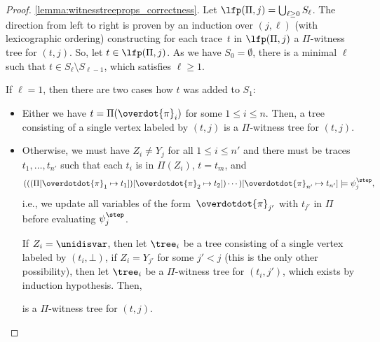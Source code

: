 \begin{proof}
\ref{lemma:witnesstreeprops_correctness}. 
Let $\lfp(\Pi, j) = \bigcup_{\ell \ge 0} S_\ell$. The direction from left to right is proven by an induction over $(j,\ell)$ (with lexicographic ordering) constructing for each trace~$t$ in $\lfp(\Pi,j)$ a $\Pi$-witness tree for $(t,j)$.
So, let $t \in \lfp(\Pi, j)$. As we have $S_0 = \emptyset$, there is a minimal $\ell$ such that $t \in S_\ell \setminus S_{\ell-1}$, which satisfies $\ell \ge 1$.

If $\ell = 1$, then there are two cases how $t$ was added to $S_1$:
\begin{itemize}
    \item Either we have $t = \Pi(\overdot{\pi}_i)$ for some $1 \le i \le n$. Then, a tree consisting of a single vertex labeled by $(t,j)$ is a $\Pi$-witness tree for $(t,j)$.
    \item Otherwise, we must have $Z_i \neq Y_j$ for all $1 \le i \le n'$ and there must be traces~$t_1, \ldots, t_{n'}$ such that each $t_i$ is in $\Pi(Z_i)$, $t = t_m$, and 
    \[
    (((\Pi[\overdotdot{\pi}_1 \mapsto t_1])[\overdotdot{\pi}_2 \mapsto t_2]) \cdots )[\overdotdot{\pi}_{n'} \mapsto t_{n'}]
    \models \psi_j^\step,\]
    i.e., we update all variables of the form~$\overdotdot{\pi}_{j'}$ with $t_{j'}$ in $\Pi$ before evaluating $\psi_j^\step$.
    
    If $Z_i = \unidisvar$, then let $\tree_i$ be a tree consisting of a single vertex labeled by $(t_i,\bot)$,
    if $Z_i = Y_{j'}$ for some $j' < j$ (this is the only other possibility), then let $\tree_i$ be a $\Pi$-witness tree for $(t_i,j')$, which exists by induction hypothesis.
    Then,
\begin{center}
\end{center}
    is a $\Pi$-witness tree for $(t,j)$.
\end{itemize}


\end{proof}
